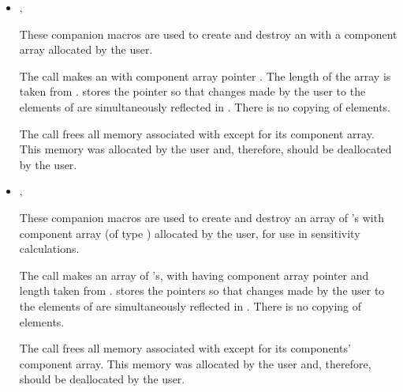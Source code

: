 \begin{itemize}
\item {}, 

      These companion macros are used to create and          
      destroy an  with a component array  
      allocated by the user.                                   
                                                               
      The call  makes  an        
       with component array pointer . The length of the  
      array is taken from .                             
       stores the pointer  so that changes      
      made by the user to the elements of  are           
      simultaneously reflected in . There is no copying of    
      elements.                                                
                                                               
      The call  frees all memory associated     
      with  except for its component array. This memory was   
      allocated by the user and, therefore, should be          
      deallocated by the user.   

\item {}, 
                             
      These companion macros are used to create and destroy  
      an array of 's with component array  
      (of type ) allocated by the user, for use in
      sensitivity calculations.

                                                               
      The call  makes   
       an array of  's, with  
      having component array pointer  and length taken from .    
       stores the pointers  so that        
      changes made by the user to the elements of  are  
      simultaneously reflected in . There is no copying of   
      elements.                                                
                                                               
      The call  frees all memory associated   
      with  except for its components' component array.      
      This memory was allocated by the user and, therefore,    
      should be deallocated by the user.                       

\end{itemize}

